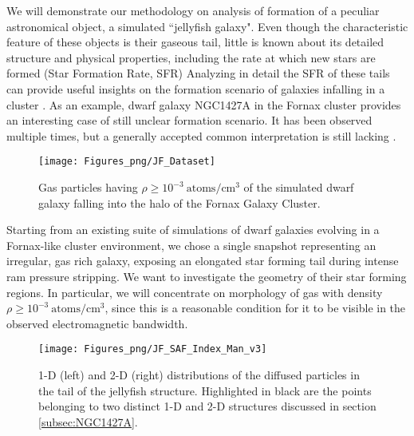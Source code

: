 We will demonstrate our methodology on analysis of formation of a peculiar astronomical object, a simulated ``jellyfish galaxy".
Even though the characteristic feature of these objects is their gaseous tail, little is known about its detailed structure and physical properties, including the rate at which new stars are formed (Star Formation Rate, SFR)
Analyzing in detail the SFR of these tails can provide useful insights on the formation scenario of galaxies infalling in a cluster \cite{Ebeling2013}. As an example, dwarf galaxy NGC1427A in the Fornax cluster provides an interesting case of still unclear formation scenario. It has been observed multiple times, but a generally accepted common interpretation is still lacking \cite{LeeWaddell2018, Mora2015}.
\begin{figure}
    \centering
    \texttt{[image: Figures\_png/JF\_Dataset]}
    \caption{Gas particles having $\rho \ge 10^{-3} ~ \mathrm{atoms/cm^3}$ of the simulated dwarf galaxy falling into the halo of the Fornax Galaxy Cluster.}
    \label{fig:JF_Dataset}
\end{figure}
Starting from an existing suite of simulations of dwarf galaxies evolving in a Fornax-like cluster environment, we chose a single snapshot representing an irregular, gas rich galaxy, exposing an elongated star forming tail during intense ram pressure stripping. We want to investigate the geometry of their star forming regions.
In particular, we will concentrate on morphology of gas with density $\rho \ge 10^{-3} ~ \mathrm{atoms/cm^3}$, %
since this is a reasonable condition for it to be visible in the observed electromagnetic bandwidth.
\begin{figure}[ht]
    \centering
    \texttt{[image: Figures\_png/JF\_SAF\_Index\_Man\_v3]}
    \caption{1-D (left) and 2-D (right) distributions of the diffused particles in the tail of the jellyfish structure.
    Highlighted in black are the points belonging to two distinct 1-D and 2-D structures discussed in section \ref{subsec:NGC1427A}.}
    \label{fig:JF_Res}
\end{figure}
